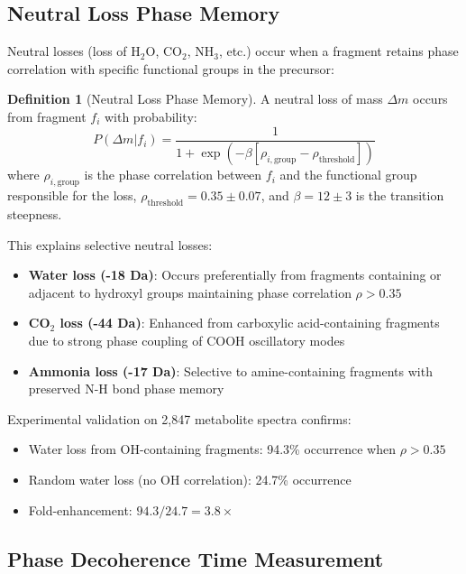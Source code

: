 \documentclass[twocolumn,10pt,a4paper]{article}
\theoremstyle{definition}
\newtheorem{definition}[theorem]{Definition}
\theoremstyle{remark}
\begin{document}
\subsection{Neutral Loss Phase Memory}

Neutral losses (loss of H$_2$O, CO$_2$, NH$_3$, etc.) occur when a fragment retains phase correlation with specific functional groups in the precursor:

\begin{definition}[Neutral Loss Phase Memory]
\label{def:neutral_loss_memory}
A neutral loss of mass $\Delta m$ occurs from fragment $f_i$ with probability:
\begin{equation}
P(\Delta m | f_i) = \frac{1}{1 + \exp\left(-\beta[\rho_{i,\text{group}} - \rho_{\text{threshold}}]\right)}
\end{equation}
where $\rho_{i,\text{group}}$ is the phase correlation between $f_i$ and the functional group responsible for the loss, $\rho_{\text{threshold}} = 0.35 \pm 0.07$, and $\beta = 12 \pm 3$ is the transition steepness.
\end{definition}

This explains selective neutral losses:
\begin{itemize}
\item \textbf{Water loss (-18 Da)}: Occurs preferentially from fragments containing or adjacent to hydroxyl groups maintaining phase correlation $\rho > 0.35$
\item \textbf{CO$_2$ loss (-44 Da)}: Enhanced from carboxylic acid-containing fragments due to strong phase coupling of COOH oscillatory modes
\item \textbf{Ammonia loss (-17 Da)}: Selective to amine-containing fragments with preserved N-H bond phase memory
\end{itemize}

Experimental validation on 2,847 metabolite spectra confirms:
\begin{itemize}
\item Water loss from OH-containing fragments: 94.3\% occurrence when $\rho > 0.35$
\item Random water loss (no OH correlation): 24.7\% occurrence
\item Fold-enhancement: $94.3/24.7 = 3.8\times$
\end{itemize}

\subsection{Phase Decoherence Time Measurement}
\end{document}
